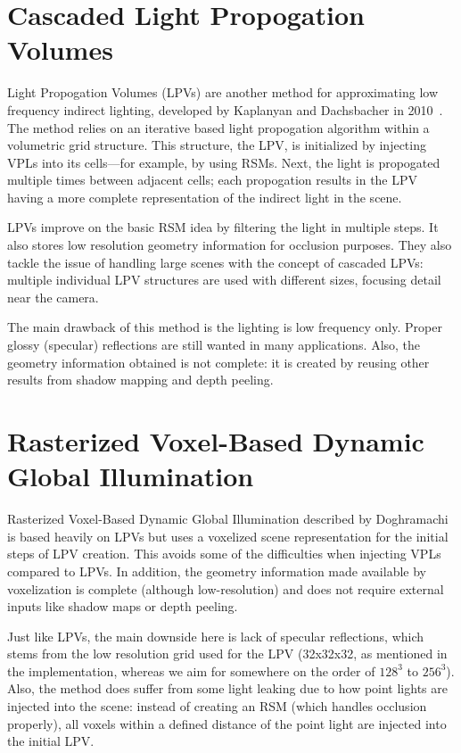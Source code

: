 \section{Cascaded Light Propogation Volumes}
Light Propogation Volumes (LPVs) are another method for approximating low frequency indirect lighting, developed by Kaplanyan and Dachsbacher in 2010~\cite{Kaplanyan:2010:CLP:1730804.1730821}. The method relies on an iterative based light propogation algorithm within a volumetric grid structure. This structure, the LPV, is initialized by injecting VPLs into its cells---for example, by using RSMs. Next, the light is propogated multiple times between adjacent cells; each propogation results in the LPV having a more complete representation of the indirect light in the scene.

LPVs improve on the basic RSM idea by filtering the light in multiple steps. It also stores low resolution geometry information for occlusion purposes. They also tackle the issue of handling large scenes with the concept of cascaded LPVs: multiple individual LPV structures are used with different sizes, focusing detail near the camera.

The main drawback of this method is the lighting is low frequency only. Proper glossy (specular) reflections are still wanted in many applications. Also, the geometry information obtained is not complete: it is created by reusing other results from shadow mapping and depth peeling.


\section{Rasterized Voxel-Based Dynamic Global Illumination}
Rasterized Voxel-Based Dynamic Global Illumination described by Doghramachi~\cite{doghramachi2013rasterized} is based heavily on LPVs but uses a voxelized scene representation for the initial steps of LPV creation. This avoids some of the difficulties when injecting VPLs compared to LPVs. In addition, the geometry information made available by voxelization is complete (although low-resolution) and does not require external inputs like shadow maps or depth peeling.

Just like LPVs, the main downside here is lack of specular reflections, which stems from the low resolution grid used for the LPV (32x32x32, as mentioned in the implementation, whereas we aim for somewhere on the order of $128^3$ to $256^3$). Also, the method does suffer from some light leaking due to how point lights are injected into the scene: instead of creating an RSM (which handles occlusion properly), all voxels within a defined distance of the point light are injected into the initial LPV.

